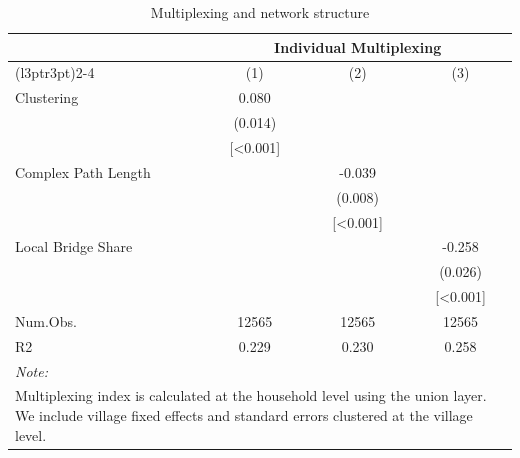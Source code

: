 \begin{table}
\centering
\caption{Multiplexing and network structure}
\centering
\begin{tabular}[t]{lccc}
\toprule
\multicolumn{1}{c}{ } & \multicolumn{3}{c}{Individual Multiplexing} \\
\cmidrule(l{3pt}r{3pt}){2-4}
  & (1) & (2) & (3)\\
\midrule
Clustering & 0.080 &  & \\
 & (0.014) &  & \\
 & {}[<0.001] &  & \\
Complex Path Length &  & -0.039 & \\
 &  & (0.008) & \\
 &  & {}[<0.001] & \\
Local Bridge Share &  &  & -0.258\\
 &  &  & (0.026)\\
 &  &  & {}[<0.001]\\
\midrule
Num.Obs. & 12565 & 12565 & 12565\\
R2 & 0.229 & 0.230 & 0.258\\
\bottomrule
\multicolumn{4}{l}{\rule{0pt}{1em}\textit{Note: }}\\
\multicolumn{4}{l}{\rule{0pt}{1em}Multiplexing index is calculated at the household level using the union layer. We include village fixed effects and standard errors clustered at the village level.}\\
\end{tabular}
\end{table}
